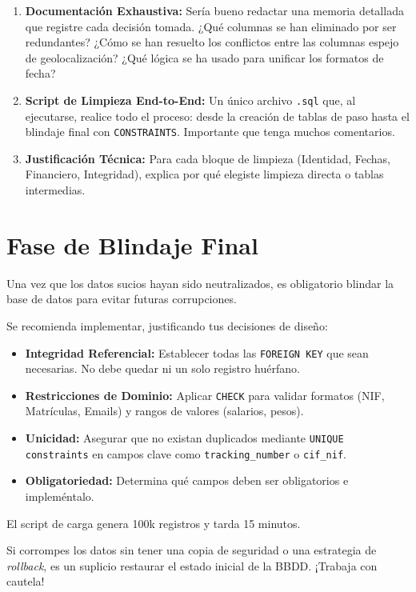 \documentclass[12pt,a4paper]{article}
\begin{document}
\begin{enumerate}
    \item \textbf{Documentación Exhaustiva:} Sería bueno redactar una memoria detallada que registre cada decisión tomada. ¿Qué columnas se han eliminado por ser redundantes? ¿Cómo se han resuelto los conflictos entre las columnas espejo de geolocalización? ¿Qué lógica se ha usado para unificar los formatos de fecha?
    \item \textbf{Script de Limpieza End-to-End:} Un único archivo \texttt{.sql} que, al ejecutarse, realice todo el proceso: desde la creación de tablas de paso hasta el blindaje final con \texttt{CONSTRAINTS}. Importante que tenga muchos comentarios.
    \item \textbf{Justificación Técnica:} Para cada bloque de limpieza (Identidad, Fechas, Financiero, Integridad), explica por qué elegiste limpieza directa o tablas intermedias.
\end{enumerate}

\section{Fase de Blindaje Final}
Una vez que los datos sucios hayan sido neutralizados, es obligatorio blindar la base de datos para evitar futuras corrupciones. 

Se recomienda implementar, justificando tus decisiones de diseño:

\begin{itemize}
    \item \textbf{Integridad Referencial:} Establecer todas las \texttt{FOREIGN KEY} que sean necesarias. No debe quedar ni un solo registro huérfano.
    \item \textbf{Restricciones de Dominio:} Aplicar \texttt{CHECK} para validar formatos (NIF, Matrículas, Emails) y rangos de valores (salarios, pesos).
    \item \textbf{Unicidad:} Asegurar que no existan duplicados mediante \texttt{UNIQUE constraints} en campos clave como \texttt{tracking\_number} o \texttt{cif\_nif}.
    \item \textbf{Obligatoriedad:} Determina qué campos deben ser obligatorios e impleméntalo. 
\end{itemize}

\begin{tcolorbox}[colback=red!5,colframe=red!75!black,title=ADVERTENCIA CRÍTICA]
El script de carga genera 100k registros y tarda 15 minutos. 

Si corrompes los datos sin tener una copia de seguridad o una estrategia de \textit{rollback}, es un suplicio restaurar el estado inicial de la BBDD. ¡Trabaja con cautela!
\end{tcolorbox}
\end{document}
